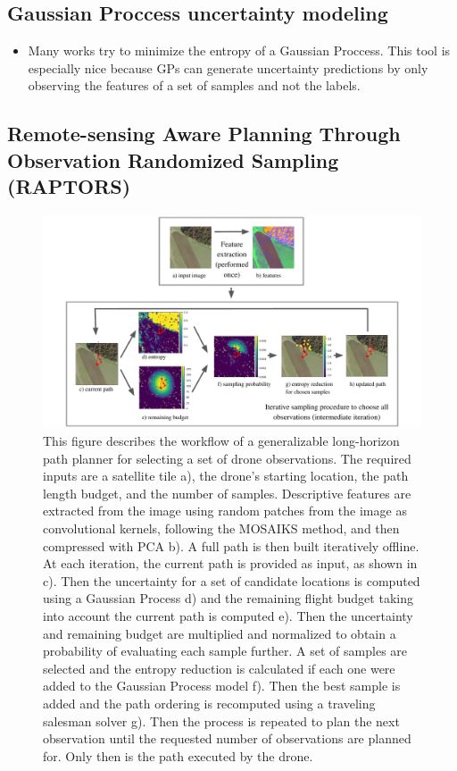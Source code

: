     
\subsection{Gaussian Proccess uncertainty modeling}
\begin{itemize}
    \item Many works try to minimize the entropy of a Gaussian Proccess. This tool is especially nice because GPs can generate uncertainty predictions by only observing the features of a set of samples and not the labels.
\end{itemize}
\subsection{Remote-sensing Aware Planning Through Observation Randomized Sampling (RAPTORS)
}
\begin{figure}
    \centering
    \includegraphics[width=\textwidth, clip, trim={1.5cm, 0, 1.5cm, 0}]{figs/methods/IPP/RAPTORS_concept_figure.pdf}
    \caption{This figure describes the workflow of a generalizable long-horizon path planner for selecting a set of drone observations. The required inputs are a satellite tile a), the drone's starting location, the path length budget, and the number of samples. Descriptive features are extracted from the image using random patches from the image as convolutional kernels, following the MOSAIKS method, and then compressed with PCA b). A full path is then built iteratively offline. At each iteration, the current path is provided as input, as shown in c). Then the uncertainty for a set of candidate locations is computed using a Gaussian Process d) and the remaining flight budget taking into account the current path is computed e). Then the uncertainty and remaining budget are multiplied and normalized to obtain a probability of evaluating each sample further. A set of samples are selected and the entropy reduction is calculated if each one were added to the Gaussian Process model f). Then the best sample is added and the path ordering is recomputed using a traveling salesman solver g). Then the process is repeated to plan the next observation until the requested number of observations are planned for. Only then is the path executed by the drone.
}
    \label{fig:methods:IPP_raptors_overview}
\end{figure}

